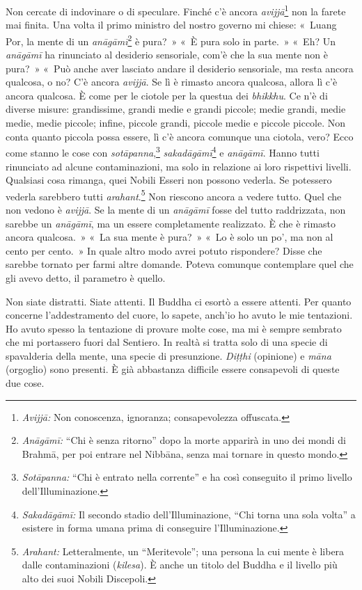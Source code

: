 Non cercate di indovinare o di speculare. Finché c'è ancora
\emph{avijjā}\footnote{\emph{Avijjā:} Non conoscenza, ignoranza;
  consapevolezza offuscata.} non la farete mai finita. Una volta il
primo ministro del nostro governo mi chiese: «~Luang Por, la mente di un
\emph{anāgāmī}\footnote{\emph{Anāgāmī:} ``Chi è senza ritorno'' dopo la
  morte apparirà in uno dei mondi di Brahmā, per poi entrare nel
  Nibbāna, senza mai tornare in questo mondo.} è pura?~» «~È pura
solo in parte.~» «~Eh? Un \emph{anāgāmī} ha rinunciato al desiderio
sensoriale, com'è che la sua mente non è pura?~» «~Può anche aver
lasciato andare il desiderio sensoriale, ma resta ancora qualcosa, o no?
C'è ancora \emph{avijjā}. Se lì è rimasto ancora qualcosa, allora lì c'è
ancora qualcosa. È come per le ciotole per la questua dei
\emph{bhikkhu}. Ce n'è di diverse misure: grandissime, grandi medie e
grandi piccole; medie grandi, medie medie, medie piccole; infine,
piccole grandi, piccole medie e piccole piccole. Non conta quanto
piccola possa essere, lì c'è ancora comunque una ciotola, vero? Ecco
come stanno le cose con \emph{sotāpanna},\footnote{\emph{Sotāpanna:}
  ``Chi è entrato nella corrente'' e ha così conseguito il primo livello
  dell'Illuminazione.} \emph{sakadāgāmī}\footnote{\emph{Sakadāgāmī:} Il
  secondo stadio dell'Illuminazione, ``Chi torna una sola volta'' a
  esistere in forma umana prima di conseguire l'Illuminazione.} e
\emph{anāgāmī}. Hanno tutti rinunciato ad alcune contaminazioni, ma solo
in relazione ai loro rispettivi livelli. Qualsiasi cosa rimanga, quei
Nobili Esseri non possono vederla. Se potessero vederla sarebbero tutti
\emph{arahant}.\footnote{\emph{Arahant:} Letteralmente, un
  ``Meritevole''; una persona la cui mente è libera dalle contaminazioni
  (\emph{kilesa}). È anche un titolo del Buddha e il livello più alto
  dei suoi Nobili Discepoli.} Non riescono ancora a vedere tutto. Quel
che non vedono è \emph{avijjā}. Se la mente di un \emph{anāgāmī} fosse
del tutto raddrizzata, non sarebbe un \emph{anāgāmī}, ma un essere
completamente realizzato. È che è rimasto ancora qualcosa.~» «~La sua
mente è pura?~» «~Lo è solo un po', ma non al cento per cento.~» In
quale altro modo avrei potuto rispondere? Disse che sarebbe tornato per
farmi altre domande. Poteva comunque contemplare quel che gli avevo
detto, il parametro è quello.

Non siate distratti. Siate attenti. Il Buddha ci esortò a essere
attenti. Per quanto concerne l'addestramento del cuore, lo sapete,
anch'io ho avuto le mie tentazioni. Ho avuto spesso la tentazione di
provare molte cose, ma mi è sempre sembrato che mi portassero fuori dal
Sentiero. In realtà si tratta solo di una specie di spavalderia della
mente, una specie di presunzione. \emph{Diṭṭhi} (opinione) e \emph{māna}
(orgoglio) sono presenti. È già abbastanza difficile essere consapevoli
di queste due cose.

